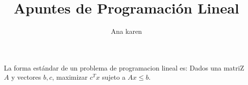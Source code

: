\documentclass{article}
\title{Apuntes de Programación Lineal}
\author{Ana karen}
\begin{document}
\maketitle

La forma estándar de un problema de programacion lineal es: Dados una matriZ $A$ y vectores $b,c$, maximizar $c^Tx$ sujeto a $Ax\leq b$.
\end{document}
